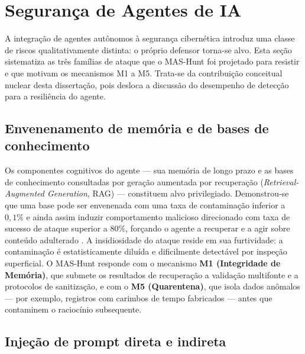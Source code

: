 \section{Segurança de Agentes de IA}
\label{sec:segagentes}

A integração de agentes autônomos à segurança cibernética introduz uma classe de riscos qualitativamente distinta: o próprio defensor torna-se alvo. Esta seção sistematiza as três famílias de ataque que o MAS-Hunt foi projetado para resistir e que motivam os mecanismos M1 a M5. Trata-se da contribuição conceitual nuclear desta dissertação, pois desloca a discussão do desempenho de detecção para a resiliência do agente.

\subsection{Envenenamento de memória e de bases de conhecimento}
\label{subsec:envenenamento}

Os componentes cognitivos do agente — sua memória de longo prazo e as bases de conhecimento consultadas por geração aumentada por recuperação (\textit{Retrieval-Augmented Generation}, RAG) — constituem alvo privilegiado. Demonstrou-se que uma base pode ser envenenada com uma taxa de contaminação inferior a $0{,}1\%$ e ainda assim induzir comportamento malicioso direcionado com taxa de sucesso de ataque superior a $80\%$, forçando o agente a recuperar e a agir sobre conteúdo adulterado \cite{NEURIPS2024_eb113910}. A insidiosidade do ataque reside em sua furtividade: a contaminação é estatisticamente diluída e dificilmente detectável por inspeção superficial. O MAS-Hunt responde com o mecanismo \textbf{M1 (Integridade de Memória)}, que submete os resultados de recuperação a validação multifonte e a protocolos de sanitização, e com o \textbf{M5 (Quarentena)}, que isola dados anômalos — por exemplo, registros com carimbos de tempo fabricados — antes que contaminem o raciocínio subsequente.

\subsection{Injeção de prompt direta e indireta}
\label{subsec:injecao}

